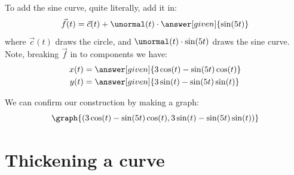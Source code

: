 \documentclass{ximera}
\begin{document}
\begin{example}
\begin{explanation}
\begin{image}
    \end{image}
    To add the sine curve, quite literally, add it in:
    \[
    \vec{f}(t) = \vec{c}(t) + \unormal(t)\cdot \answer[given]{\sin(5t)}
    \]
    where $\vec{c}(t)$ draws the circle, and $\unormal(t)\cdot
    \sin(5t)$ draws the sine curve. Note, breaking $\vec{f}$ in to components we have:
    \begin{align*}
      x(t) &= \answer[given]{3\cos(t)-\sin(5t)\cos(t)}\\
      y(t) &= \answer[given]{3\sin(t)-\sin(5t)\sin(t)}
    \end{align*}
    \begin{onlineOnly}
      We can confirm our construction by making a graph:
      \[
      \graph{(3\cos(t)-\sin(5t)\cos(t),3\sin(t)-\sin(5t)\sin(t))}
      \]
    \end{onlineOnly}
  \end{explanation}
\end{example}

\section{Thickening a curve}
\end{document}
